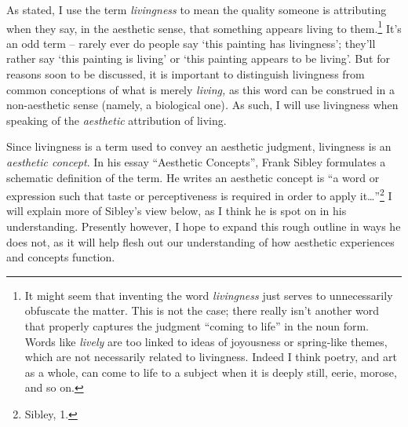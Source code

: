 As stated, I use the term \emph{livingness} to mean the quality someone
is attributing when they say, in the aesthetic sense, that something
appears living to them.\footnote{It might seem that inventing the word
  \emph{livingness} just serves to unnecessarily obfuscate the matter.
  This is not the case; there really isn't another word that properly
  captures the judgment ``coming to life'' in the noun form. Words like
  \emph{lively} are too linked to ideas of joyousness or spring-like
  themes, which are not necessarily related to livingness. Indeed I
  think poetry, and art as a whole, can come to life to a subject when
  it is deeply still, eerie, morose, and so on.} It's an odd term --
rarely ever do people say `this painting has livingness'; they'll rather
say `this painting is living' or `this painting appears to be living'.
But for reasons soon to be discussed, it is important to distinguish
livingness from common conceptions of what is merely \emph{living,} as
this word can be construed in a non-aesthetic sense (namely, a
biological one)\emph{.} As such, I will use livingness when speaking of
the \emph{aesthetic} attribution of living.

Since livingness is a term used to convey an aesthetic judgment,
livingness is an \emph{aesthetic concept}. In his essay ``Aesthetic
Concepts'', Frank Sibley formulates a schematic definition of the term.
He writes an aesthetic concept is ``a word or expression such that taste
or perceptiveness is required in order to apply it\ldots''\footnote{Sibley,
  1.} I will explain more of Sibley's view below, as I think he is spot
on in his understanding. Presently however, I hope to expand this rough
outline in ways he does not, as it will help flesh out our understanding
of how aesthetic experiences and concepts function.


